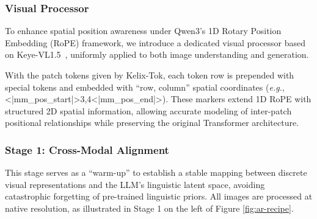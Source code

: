\documentclass[11pt, a4paper, logo, copyright]{googledeepmind}
\begin{document}
\subsubsection{Visual Processor}
To enhance spatial position awareness under Qwen3’s 1D Rotary Position Embedding (RoPE) framework, we introduce a dedicated visual processor based on Keye-VL1.5~\citep{yang2025kwai}, uniformly applied to both image understanding and generation.

With the patch tokens given by Kelix-Tok, each token row is prepended with special tokens and embedded with ``row, column'' spatial coordinates (\textit{e.g.}, <|mm\_pos\_start|>3,4<|mm\_pos\_end|>). These markers extend 1D RoPE with structured 2D spatial information, allowing accurate modeling of inter-patch positional relationships while preserving the original Transformer architecture.




\subsubsection{Stage 1: Cross-Modal Alignment}
This stage serves as a ``warm-up'' to establish a stable mapping between discrete visual representations and the LLM’s linguistic latent space, avoiding catastrophic forgetting of pre-trained linguistic priors. All images are processed at native resolution, as illustrated in Stage 1 on the left of Figure \ref{fig:ar-recipe}.
\end{document}
